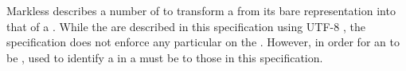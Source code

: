Markless describes a number of  to transform a  from its bare  representation into that of a . While the  are described in this specification using UTF-8 , the specification does not enforce any particular  on the . However, in order for an  to be ,  used to identify a  in a  must be  to those in this specification.

